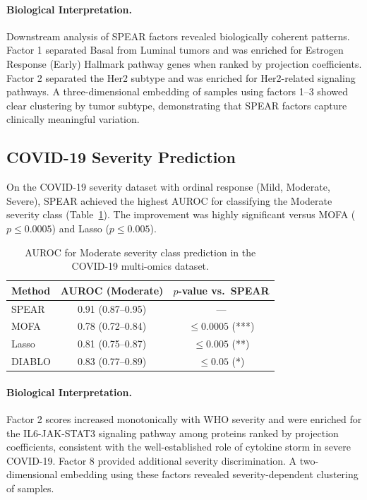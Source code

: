 \documentclass[11pt]{article}
\begin{document}
\paragraph{Biological Interpretation.} Downstream analysis of SPEAR factors revealed biologically coherent patterns. Factor 1 separated Basal from Luminal tumors and was enriched for Estrogen Response (Early) Hallmark pathway genes when ranked by projection coefficients. Factor 2 separated the Her2 subtype and was enriched for Her2-related signaling pathways. A three-dimensional embedding of samples using factors 1--3 showed clear clustering by tumor subtype, demonstrating that SPEAR factors capture clinically meaningful variation.

\subsection{COVID-19 Severity Prediction}

On the COVID-19 severity dataset with ordinal response (Mild, Moderate, Severe), SPEAR achieved the highest AUROC for classifying the Moderate severity class (Table~\ref{tab:covid_auroc}). The improvement was highly significant versus MOFA ($p \leq 0.0005$) and Lasso ($p \leq 0.005$).

\begin{table}[htbp]
\centering
\caption{AUROC for Moderate severity class prediction in the COVID-19 multi-omics dataset.}
\label{tab:covid_auroc}
\begin{tabular}{lcc}
\toprule
\textbf{Method} & \textbf{AUROC (Moderate)} & \textbf{$p$-value vs.\ SPEAR} \\
\midrule
SPEAR & 0.91 (0.87--0.95) & --- \\
MOFA & 0.78 (0.72--0.84) & $\leq 0.0005$ (***) \\
Lasso & 0.81 (0.75--0.87) & $\leq 0.005$ (**) \\
DIABLO & 0.83 (0.77--0.89) & $\leq 0.05$ (*) \\
\bottomrule
\end{tabular}
\end{table}

\paragraph{Biological Interpretation.} Factor 2 scores increased monotonically with WHO severity and were enriched for the IL6-JAK-STAT3 signaling pathway among proteins ranked by projection coefficients, consistent with the well-established role of cytokine storm in severe COVID-19. Factor 8 provided additional severity discrimination. A two-dimensional embedding using these factors revealed severity-dependent clustering of samples.
\end{document}
